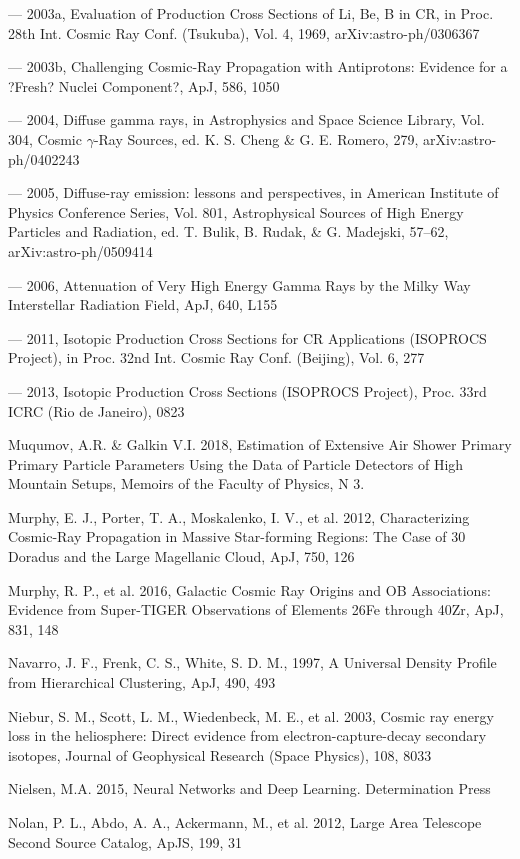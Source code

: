 --- 2003a, Evaluation of Production Cross Sections of Li, Be, B in CR, in Proc. 28th Int. Cosmic Ray Conf. (Tsukuba), Vol. 4, 1969, arXiv:astro-ph/0306367

--- 2003b, Challenging Cosmic-Ray Propagation with Antiprotons: Evidence for a ?Fresh? Nuclei Component?, ApJ, 586, 1050

--- 2004, Diffuse gamma rays, in Astrophysics and Space Science Library, Vol. 304, Cosmic $\gamma$-Ray Sources, ed. K. S. Cheng \& G. E. Romero, 279, arXiv:astro-ph/0402243

--- 2005, Diffuse-ray emission: lessons and perspectives, in American Institute of Physics Conference Series, Vol. 801, Astrophysical Sources of High Energy Particles and Radiation, ed. T. Bulik, B. Rudak, \& G. Madejski, 57--62, arXiv:astro-ph/0509414

--- 2006, Attenuation of Very High Energy Gamma Rays by the Milky Way Interstellar Radiation Field, ApJ, 640, L155

--- 2011, Isotopic Production Cross Sections for CR Applications (ISOPROCS Project), in Proc. 32nd Int. Cosmic Ray Conf. (Beijing), Vol. 6, 277

--- 2013, Isotopic Production Cross Sections (ISOPROCS Project), Proc. 33rd ICRC (Rio de Janeiro), 0823

Muqumov, A.R. \& Galkin V.I. 2018, Estimation of Extensive Air Shower Primary Primary Particle Parameters Using the Data of Particle Detectors of High Mountain Setups, Memoirs of the Faculty of Physics, N 3.

Murphy, E. J., Porter, T. A., Moskalenko, I. V., et al. 2012, Characterizing Cosmic-Ray Propagation in Massive Star-forming Regions: The Case of 30 Doradus and the Large Magellanic Cloud, ApJ, 750, 126

Murphy, R. P., et al. 2016, Galactic Cosmic Ray Origins and OB Associations: Evidence from Super-TIGER Observations of Elements 26Fe through 40Zr, ApJ, 831, 148

Navarro, J. F., Frenk, C. S., White, S. D. M., 1997, A Universal Density Profile from Hierarchical Clustering, ApJ, 490, 493

Niebur, S. M., Scott, L. M., Wiedenbeck, M. E., et al. 2003, Cosmic ray energy loss in the heliosphere: Direct evidence from electron-capture-decay secondary isotopes, Journal of Geophysical Research (Space Physics), 108, 8033

Nielsen, M.A. 2015, Neural Networks and Deep Learning. Determination Press

Nolan, P. L., Abdo, A. A., Ackermann, M., et al. 2012, \fermi{} Large Area Telescope Second Source Catalog, ApJS, 199, 31

